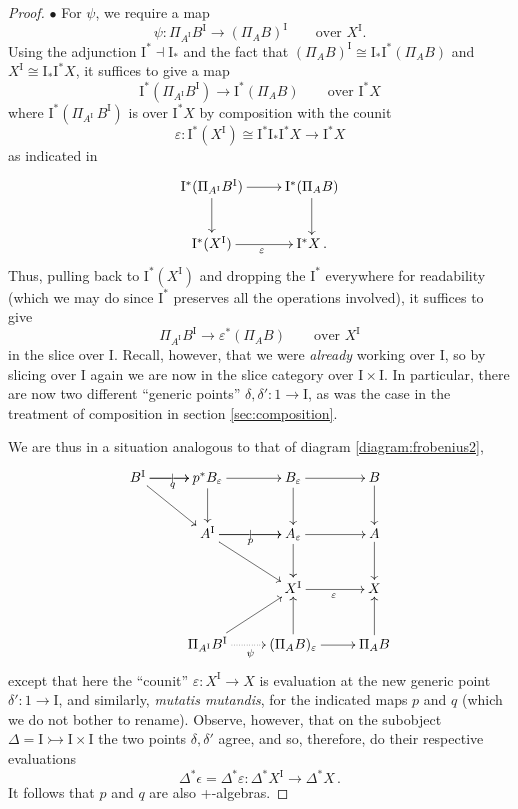 \documentclass[11pt]{article}
\newcommand{\mono}{\ensuremath{\rightarrowtail}}
\newcommand{\ra}{\ensuremath{\rightarrow}}
\newcommand{\I}{\ensuremath{\mathrm{I}}}
\theoremstyle{remark}
\theoremstyle{definition}
\begin{document}
\begin{proof}
\medskip
\noindent $\bullet$ For $\psi$, we require a map 
\[
\psi:\Pi_{A^\I}B^\I \to (\Pi_AB)^\I \qquad \text{over $X^\I$.}
\]
Using the adjunction $\I^*\!\dashv \I_*$ and the fact that $(\Pi_AB)^\I  \cong \I_*\I^*(\Pi_AB)$ and $X^\I \cong \I_*\I^*X$, it suffices to give a map  
\[
\I^*(\Pi_{A^\I}B^\I) \to \I^*(\Pi_AB) \qquad \text{over $\I^*X$}
\]
where $\I^*(\Pi_{A^\I}\,B^\I)$ is over $\I^*X$ by composition with the counit
\[
\varepsilon: \I^*(X^\I)\cong \I^*\I_*\I^*X \to \I^*X
\]
as indicated in
\begin{equation}\label{diagram:frobenius5}
\xymatrix{
\I^*(\Pi_{A^\I}B^\I) \ar[r] \ar[d] &  \I^*(\Pi_AB)  \ar[d] \\
\I^*(X^\I) \ar[r]_\varepsilon & \I^*X\,.
}
\end{equation}
Thus, pulling back to $\I^*(X^\I)$ and dropping the $\I^*$ everywhere for readability (which we may do since $\I^*$ preserves all the operations involved), it suffices to give
\begin{equation}\label{eq:needforpsi}
\Pi_{A^\I}B^\I \to \varepsilon^*(\Pi_AB) \qquad \text{over $X^\I$}
\end{equation}
in the slice over $\I$. Recall, however, that we were \emph{already} working over $\I$, so by slicing over $\I$ again we are now in the slice category over $\I\times\I$.  In particular, there are now two different ``generic points'' $\delta, \delta' : 1 \ra \I$, as was the case in the treatment of composition in section \ref{sec:composition}.

We are thus in a situation analogous to that of diagram \ref{diagram:frobenius2},  
\begin{equation}\label{diagram:frobenius6}
\xymatrix{
B^\I \ar[r]|| \ar[r]_{q} \ar[rd]  & p^*B_\varepsilon \ar[r]  \ar[d]  & B_{\varepsilon}  \ar[d]   \ar[r] & B \ar[d] \\
& A^\I \ar[r]|| \ar[r]_{p}  \ar[rd]  & A_{\varepsilon} \ar[d]   \ar[r] & A \ar[d] \\
&& X^\I \ar[r]_{\varepsilon} &  X \\
& \Pi_{A^\I}B^\I \ar[ru] \ar@{..>}[r]_\psi  & (\Pi_AB)_\varepsilon  \ar[u] \ar[r] & \Pi_AB \ar[u]
}
\end{equation}
except that here the ``counit'' $\varepsilon: X^\I \ra X$ is evaluation at the new generic point $\delta': 1\ra \I$, and similarly, \emph{mutatis mutandis}, for the indicated maps $p$ and $q$ (which we do not bother to rename).  
Observe, however, that on the subobject $\Delta = \I \mono \I\times\I$ the two points $\delta, \delta'$ agree, and so, therefore, do their respective evaluations $$\Delta^*\epsilon = \Delta^*\varepsilon: \Delta^*X^\I \to \Delta^*X\,.$$
It follows that $p$ and $q$ are also +-algebras. 


\end{proof}
\end{document}
